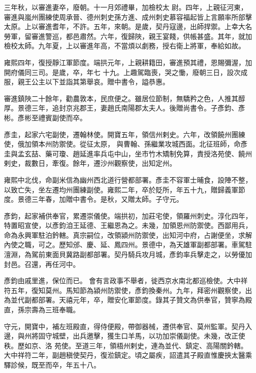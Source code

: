 \begin{pinyinscope}
 三年秋，以審進妻卒，廢朝。十一月郊禮畢，加檢校太
 尉。四年，上親征河東，審進與嵐州團練使周承晉、德州刺史孫方進、成州刺史慕容福起皆上言願率所部擊太原。上以審進耆年，不許。五年，來朝。是歲，契丹寇邊，出師捍禦。上幸大名勞軍，留審進警巡，都邑肅然。六年，復歸陜，親王宴餞，供帳甚盛。其年，就加檢校太師。九年夏，上以審進年高，不當煩以劇務，授右衛上將軍，奉給如故。



 雍熙四年，復授靜江軍節度。端拱元年，上親耕籍田，審進預其禮，恩賜彌渥，加開府儀同三司。是歲，卒，年七
 十九。上趣駕臨喪，哭之慟，廢朝三日，設次成服，親王公主以下並詣其第舉哀。贈中書令，謚恭惠。



 審進鎮陜二十餘年，勸農敦本，民庶便之。雖居位節制，無驕矜之色，人推其醇厚。景德三年，追封京兆郡王，妻趙氏南陽郡太夫人。後贈尚書令。子彥鈞、彥彬。彥彬至禮賓副使而卒。



 彥圭，起家六宅副使，遷翰林使。開寶五年，領信州剌史。六年，改領饒州團練使，俄加領本州防禦使。從征太原，
 與曹翰、孫繼業攻城西面。北征班師，命彥圭與孟玄喆、藥可瓊、趙延進率兵屯中山，坐市竹木矯制免算，責授洛苑使、饒州剌史，裁數日，牽復。餘年，遷沙州觀察使，出知定州。



 雍熙中北伐，命副米信為幽州西北道行營都部署。彥圭不容軍士晡食，設陣不整，以致亡失，坐左遷均州團練副使。雍熙二年，卒於貶所，年五十九，贈歸義軍節度。景德三年春，加贈中書令。是秋，又贈太師。子守元。



 彥鈞，起家補供奉官，累遷崇儀使。端拱初，加莊宅使，領羅州刺史。淳化四年，特置昭宣使，以彥鈞洎王延德、王繼恩為之。未幾，加領恩州防禦使。西鄙用兵，命為永興軍駐泊鈐轄。真宗嗣位，改領潁州防禦使，出知河中府，占謝便坐，求解內使之職，可之。歷知邠、慶、延、鳳四州。景德中，為天雄軍副都部署。車駕駐澶淵，為駕前東面貝冀路副都部署。契丹騎兵攻月城，彥鈞率兵擊走之，以勞優加封邑。召還，再任河中。



 彥鈞由戚里進，保位而已。
 會有言政事不舉者，徙西京水南北都巡檢使。大中祥符五年，復知莫州。馬知節為潁州防禦使，彥鈞換秦州。九年，拜密州觀察使，出為並代副都部署。天禧元年，卒，贈安化軍節度。錄其子贊文為供奉官，贊寧為殿直，孫宗壽為三班奉職。



 守元，開寶中，補左班殿直，得侍便殿，帶御器械，遷供奉官、莫州監軍。契丹入邊，與州將固守城壁，出兵邀擊，獲生口羊馬，以功加崇儀副使。未幾，改正使秩。歷如京、洛
 苑使。至道三年，領梧州剌史，連為並代、鎮定、高陽關鈐轄。大中祥符二年，副趙稹使契丹，復涖鎮定。頃之屬疾，詔遣其子殿直惟慶挾太醫乘驛診候，既至而卒，年五十八。




\end{pinyinscope}
